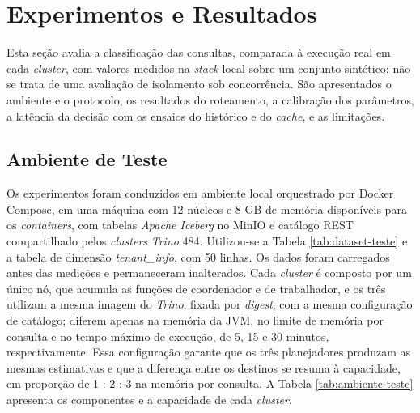 \FloatBarrier
\section{Experimentos e Resultados}
\label{sec:experimentos}

Esta seção avalia a classificação das consultas, comparada à execução real em cada \textit{cluster}, com valores medidos na \textit{stack} local sobre um conjunto sintético; não se trata de uma avaliação de isolamento sob concorrência. São apresentados o ambiente e o protocolo, os resultados do roteamento, a calibração dos parâmetros, a latência da decisão com os ensaios do histórico e do \textit{cache}, e as limitações.

\subsection{Ambiente de Teste}

Os experimentos foram conduzidos em ambiente local orquestrado por Docker Compose, em uma máquina com 12 núcleos e 8 GB de memória disponíveis para os \textit{containers}, com tabelas \textit{Apache Iceberg} no MinIO e catálogo REST compartilhado pelos \textit{clusters} \textit{Trino} 484. Utilizou-se a Tabela \ref{tab:dataset-teste} e a tabela de dimensão \textit{tenant\_info}, com 50 linhas. Os dados foram carregados antes das medições e permaneceram inalterados. Cada \textit{cluster} é composto por um único nó, que acumula as funções de coordenador e de trabalhador, e os três utilizam a mesma imagem do \textit{Trino}, fixada por \textit{digest}, com a mesma configuração de catálogo; diferem apenas na memória da JVM, no limite de memória por consulta e no tempo máximo de execução, de 5, 15 e 30 minutos, respectivamente. Essa configuração garante que os três planejadores produzam as mesmas estimativas e que a diferença entre os destinos se resuma à capacidade, em proporção de 1 : 2 : 3 na memória por consulta. A Tabela \ref{tab:ambiente-teste} apresenta os componentes e a capacidade de cada \textit{cluster}.

